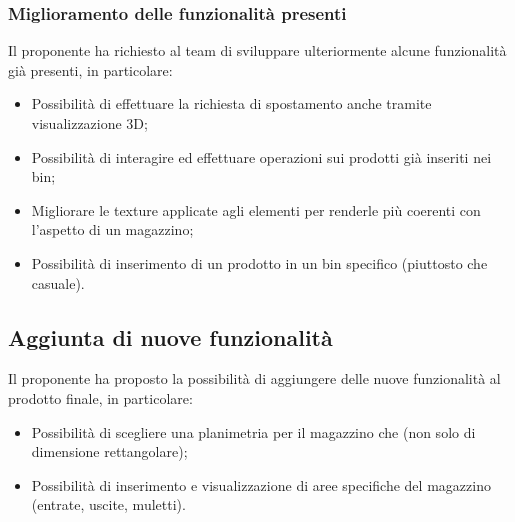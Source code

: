 \subsubsection{Miglioramento delle funzionalità presenti}
Il proponente ha richiesto al team di sviluppare ulteriormente alcune funzionalità già presenti, in particolare:
\begin{itemize}
    \item Possibilità di effettuare la richiesta di spostamento anche tramite visualizzazione 3D;
    \item Possibilità di interagire ed effettuare operazioni sui prodotti già inseriti nei bin;
    \item Migliorare le texture applicate agli elementi per renderle più coerenti con l'aspetto di un magazzino;
    \item Possibilità di inserimento di un prodotto in un bin specifico (piuttosto che casuale).
\end{itemize}
\subsection{Aggiunta di nuove funzionalità}
Il proponente ha proposto la possibilità di aggiungere delle nuove funzionalità al prodotto finale, in particolare:
\begin{itemize}    
    \item Possibilità di scegliere una planimetria per il magazzino che (non solo di dimensione rettangolare);
    \item Possibilità di inserimento e visualizzazione di aree specifiche del magazzino (entrate, uscite, muletti).
\end{itemize}
